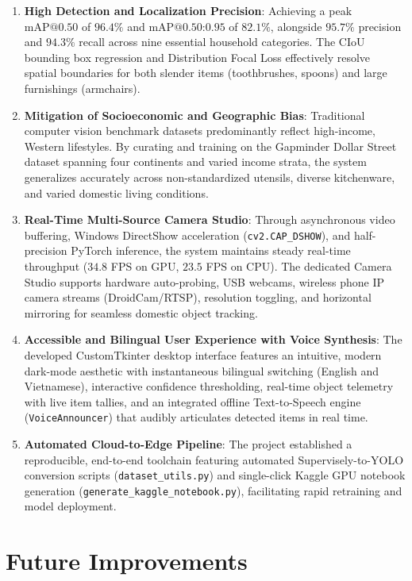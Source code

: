 \begin{enumerate}
    \item \textbf{High Detection and Localization Precision}: Achieving a peak $\text{mAP@0.50}$ of $\mathbf{96.4\%}$ and $\text{mAP@0.50:0.95}$ of $\mathbf{82.1\%}$, alongside $95.7\%$ precision and $94.3\%$ recall across nine essential household categories. The CIoU bounding box regression and Distribution Focal Loss effectively resolve spatial boundaries for both slender items (toothbrushes, spoons) and large furnishings (armchairs).
    \item \textbf{Mitigation of Socioeconomic and Geographic Bias}: Traditional computer vision benchmark datasets predominantly reflect high-income, Western lifestyles. By curating and training on the Gapminder Dollar Street dataset spanning four continents and varied income strata, the system generalizes accurately across non-standardized utensils, diverse kitchenware, and varied domestic living conditions.
    \item \textbf{Real-Time Multi-Source Camera Studio}: Through asynchronous video buffering, Windows DirectShow acceleration (\texttt{cv2.CAP\_DSHOW}), and half-precision PyTorch inference, the system maintains steady real-time throughput ($34.8$ FPS on GPU, $23.5$ FPS on CPU). The dedicated Camera Studio supports hardware auto-probing, USB webcams, wireless phone IP camera streams (DroidCam/RTSP), resolution toggling, and horizontal mirroring for seamless domestic object tracking.
    \item \textbf{Accessible and Bilingual User Experience with Voice Synthesis}: The developed CustomTkinter desktop interface features an intuitive, modern dark-mode aesthetic with instantaneous bilingual switching (English and Vietnamese), interactive confidence thresholding, real-time object telemetry with live item tallies, and an integrated offline Text-to-Speech engine (\texttt{VoiceAnnouncer}) that audibly articulates detected items in real time.
    \item \textbf{Automated Cloud-to-Edge Pipeline}: The project established a reproducible, end-to-end toolchain featuring automated Supervisely-to-YOLO conversion scripts (\texttt{dataset\_utils.py}) and single-click Kaggle GPU notebook generation (\texttt{generate\_kaggle\_notebook.py}), facilitating rapid retraining and model deployment.
\end{enumerate}

\section{Future Improvements}
\label{sec:future_improvements}

